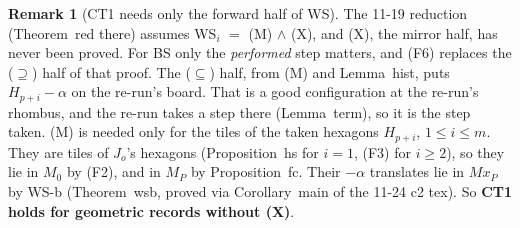 \documentclass[11pt]{article}
\theoremstyle{definition}\newtheorem{definition}[theorem]{Definition}\newtheorem{remark}[theorem]{Remark}
\begin{document}
\begin{remark}[CT1 needs only the forward half of WS]\label{rem:ct1}
The 11-19 reduction (Theorem~red there) assumes WS$_i$ $=$ (M) $\wedge$ (X), and (X), the mirror half, has never been proved. For BS only the \emph{performed} step matters, and (F6) replaces the ($\supseteq$) half of that proof. The ($\subseteq$) half, from (M) and Lemma~hist, puts $H_{p+i}-\alpha$ on the re-run's board. That is a good configuration at the re-run's rhombus, and the re-run takes a step there (Lemma~term), so it is the step taken. (M) is needed only for the tiles of the taken hexagons $H_{p+i}$, $1\le i\le m$. They are tiles of $J_o$'s hexagons (Proposition~hs for $i=1$, (F3) for $i\ge2$), so they lie in $M_0$ by (F2), and in $M_P$ by Proposition~fc. Their $-\alpha$ translates lie in $Mx_P$ by WS-b (Theorem~wsb, proved via Corollary~main of the 11-24 c2 tex). So \textbf{CT1 holds for geometric records without (X)}.
\end{remark}
\end{document}
